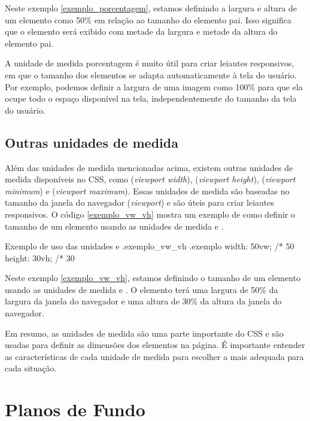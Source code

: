 Neste exemplo \ref{exemplo_porcentagem}, estamos definindo a largura e altura de um elemento como 50\% em relação ao tamanho do elemento pai. Isso significa que o elemento será exibido com metade da largura e metade da altura do elemento pai.

A unidade de medida porcentagem é muito útil para criar leiautes responsivos, em que o tamanho dos elementos se adapta automaticamente à tela do usuário. Por exemplo, podemos definir a largura de uma imagem como 100\% para que ela ocupe todo o espaço disponível na tela, independentemente do tamanho da tela do usuário.

\subsection{Outras unidades de medida}

Além das unidades de medida mencionadas acima, existem outras unidades de medida disponíveis no CSS, como  (\textit{viewport width}),  (\textit{viewport height}),  (\textit{viewport minimum}) e  (\textit{viewport maximum}). Essas unidades de medida são baseadas no tamanho da janela do navegador (\textit{viewport}) e são úteis para criar leiautes responsivos. O código \ref{exemplo_vw_vh} mostra um exemplo de como definir o tamanho de um elemento usando as unidades de medida  e .

\begin{csscode}{Exemplo de uso das unidades  e .}{exemplo_vw_vh}
.exemplo {
    width: 50vw; /* 50%
    height: 30vh; /* 30%
}
\end{csscode}

Neste exemplo \ref{exemplo_vw_vh}, estamos definindo o tamanho de um elemento usando as unidades de medida  e . O elemento terá uma largura de 50\% da largura da janela do navegador e uma altura de 30\% da altura da janela do navegador.

Em resumo, as unidades de medida são uma parte importante do CSS e são usadas para definir as dimensões dos elementos na página. É importante entender as características de cada unidade de medida para escolher a mais adequada para cada situação.

\section{Planos de Fundo}

